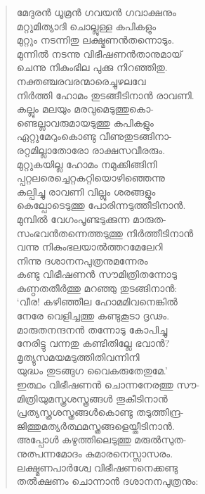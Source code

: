 \begin{verse}
മേദുരന്‍ ധൂമ്രന്‍ ഗവയന്‍ ഗവാക്ഷനും\\
മറ്റുമിത്യാദി ചൊല്ലുള്ള കപികളും\\
മുറ്റും നടന്നിതു ലക്ഷ്മണന്‍തന്നൊടും.\\
മുന്നില്‍ നടന്നു വിഭീഷണന്‍താനുമായ്\\
ചെന്നു നികുംഭില പുക്കു നിറഞ്ഞിതു.\\
നക്തഞ്ചരവരന്മാരെച്ചുഴലവേ\\
നിര്‍ത്തി ഹോമം തുടങ്ങീടിനാന്‍ രാവണി.\\
കല്ലും മലയും മരവുമെടുത്തുകൊ-\\
ണ്ടെല്ലാവരുമായടുത്തു കപികളും\\
ഏറ്റുമേറുംകൊണ്ടു വീണുതുടങ്ങിനാ-\\
രറ്റമില്ലാതോരോ രാക്ഷസവീരരും.\\
മുറ്റുകയില്ല ഹോമം നമുക്കിങ്ങിനി\\
പ്പറ്റലരെച്ചെറ്റകറ്റിയൊഴിഞ്ഞെന്നു\\
കല്പിച്ചു രാവണി വില്ലും ശരങ്ങളും\\
കെല്പോടെടുത്തു പോരിന്നടുത്തീടിനാന്‍.\\
മുമ്പില്‍ വേഗംപൂണ്ടടുക്കുന്ന മാരുത-\\
സംഭവന്‍തന്നെത്തടുത്തു നിര്‍ത്തീടിനാന്‍\\
വന്നു നികുംഭലയാല്‍ത്തറമേലേറി\\
നിന്നു ദശാനനപുത്രനുമന്നേരം\\
കണ്ടു വിഭീഷണന്‍ സൗമിത്രിതന്നോടു\\
കുണ്ഠതതീര്‍ത്തു മറഞ്ഞു തുടങ്ങിനാന്‍:\\
‘വീര! കഴിഞ്ഞീല ഹോമമിവനെങ്കില്‍\\
നേരേ വെളിച്ചത്തു കണ്ടുകൂടാ ദൃഢം.\\
മാരുതനന്ദനന്‍ തന്നോടു കോപിച്ചു\\
നേരിട്ടു വന്നതു കണ്ടിതില്ലേ ഭവാന്‍?\\
മൃത്യുസമയമടുത്തിതിവന്നിനി\\
യുദ്ധം തുടങ്ങുഗ വൈകരുതേതുമേ.’\\
ഇത്ഥം വിഭീഷണന്‍ ചൊന്നനേരത്തു സൗ-\\
മിത്രിയുമസ്ത്രശസ്ത്രങ്ങള്‍ തൂകീടിനാന്‍\\
പ്രത്യസ്ത്രശസ്ത്രങ്ങള്‍കൊണ്ടു തടുത്തിന്ദ്ര-\\
ജിത്തുമത്യര്‍ത്ഥമസ്ത്രങ്ങളെയ്തീടിനാന്‍.\\
അപ്പോള്‍ കഴുത്തിലെടുത്തു മരുല്‍സുത-\\
നുത്പന്നമോദം കുമാരനെസ്സാസരം.\\
ലക്ഷ്മണപാര്‍ശ്വേ വിഭീഷണനെക്കണ്ടു\\
തല്‍ക്ഷണം ചൊന്നാന്‍ ദശാനനപുത്രനും:\\

\end{verse}
